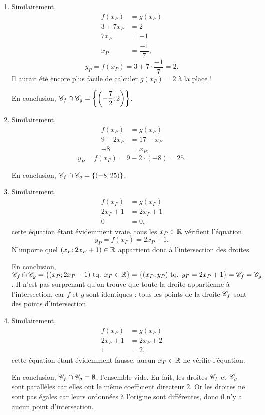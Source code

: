 {\begin{enumerate}
		\item 
			Similairement,
			\begin{align*}
				f(x_P) &= g(x_P) \\
				3 + 7x_P & = 2 \\
				7x_P &= -1 \\
				x_P &= \dfrac{-1}7,
			\end{align*}
			\[
				y_P = f(x_P) = 3+7\cdot \dfrac{-1}7  = 2.
			\]
			Il aurait été encore plus facile de calculer $g(x_P) = 2$ à la place !
			
			En conclusion, $\mathcal{C}_f \cap \mathcal{C}_g = \left\{ \left(-\dfrac72 ; 2\right) \right\}$.
		
		\item
			Similairement,
			\begin{align*}
				f(x_P) &= g(x_P) \\
				9-2x_P & = 17-x_P \\
				-8 &= x_P,
			\end{align*}
			\[
				y_P = f(x_P) = 9-2 \cdot(-8) = 25.
			\]
		
			En conclusion, $\mathcal{C}_f \cap \mathcal{C}_g = \left\{ (-8;25) \right\}$.
		
		\item 			
		Similairement,
			\begin{align*}
				f(x_P) &= g(x_P) \\
				2x_P + 1 & = 2x_P + 1 \\
				0 &= 0,
			\end{align*}
			cette équation étant évidemment vraie, tous les $x_P \in \mathbb{R}$ vérifient l'équation.
			\[
				y_P = f(x_P) = 2x_P + 1.
			\]
			N'importe quel $(x_P ; 2x_P+1) \in \mathbb{R}$ appartient donc à l'intersection des droites.
			
			En conclusion, $\mathcal{C}_f \cap \mathcal{C}_g = \{ (x_P ; 2x_P+1) \text{ tq. } x_P \in \mathbb{R} \} = \{ (x_P ; y_P) \text{ tq. } y_P = 2x_P + 1 \} = \mathcal{C}_f = \mathcal{C}_g$.
			Il n'est pas surprenant qu'on trouve que toute la droite appartienne à l'intersection, car $f$ et $g$ sont identiques : tous les points de la droite $\mathcal{C}_f$ sont des points d'intersection.
		
		
		\item 
			Similairement,
			\begin{align*}
				f(x_P) &= g(x_P) \\
				2x_P + 1 & = 2x_P + 2 \\
				1 &= 2,
			\end{align*}
			cette équation étant évidemment fausse, aucun $x_P \in \mathbb{R}$ ne vérifie l'équation.
			
			En conclusion, $\mathcal{C}_f \cap \mathcal{C}_g = \emptyset$, l'ensemble vide.
			En fait, les droites $\mathcal{C}_f$ et $\mathcal{C}_g$ sont parallèles car elles ont le même coefficient directeur $2$.
			Or les droites ne sont pas égales car leurs ordonnées à l'origine sont différentes, donc il n'y a aucun point d'intersection.
	\end{enumerate}

}

